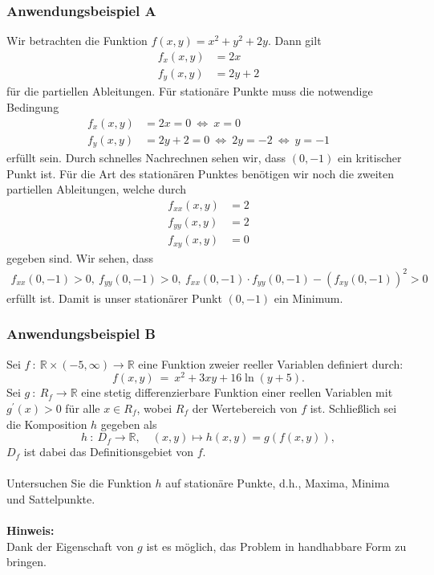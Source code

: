 \subsubsection*{Anwendungsbeispiel A}

Wir betrachten die Funktion $f(x,y) = x^2+ y^2 + 2y$.
Dann gilt
\begin{align*}
f_x(x,y) &= 2x\\
f_y(x,y) &= 2y+ 2
\end{align*}
für die partiellen Ableitungen.
Für stationäre Punkte muss die notwendige Bedingung 
\begin{align*}
f_x(x,y) &= 2x = 0 \ \Leftrightarrow \ x = 0\\
f_y(x,y) &= 2y +2 = 0 \ \Leftrightarrow \ 2y = -2 
\ \Leftrightarrow \ y = -1
\end{align*}
erfüllt sein.
Durch schnelles Nachrechnen sehen wir, dass $(0,-1)$ ein kritischer Punkt ist.
Für die Art des stationären Punktes benötigen wir noch die zweiten partiellen Ableitungen, welche durch
\begin{align*}
f_{xx}(x,y) &= 2\\
f_{yy}(x,y) &= 2\\
f_{xy}(x,y) &= 0
\end{align*}
gegeben sind.
Wir sehen, dass
\begin{align*}
f_{xx}(0,-1) > 0, \ f_{yy}(0,-1) > 0 , \ f_{xx}(0,-1) \cdot f_{yy}(0,-1) - (f_{xy}(0,-1))^2 > 0
\end{align*}
erfüllt ist.
Damit is unser stationärer Punkt $(0,-1)$ ein Minimum.
\newpage
\subsubsection*{Anwendungsbeispiel B}
Sei $f \ : \ \mathbb{R} \times (-5, \infty) \to \mathbb{R}$ eine Funktion zweier reeller Variablen definiert durch:
\begin{equation*}
f(x,y)\ = \ x^2 + 3 x y + 16 \ln(y+5).
\end{equation*}
Sei $g \ : \ R_f \to \mathbb{R}$ eine stetig differenzierbare Funktion einer reellen Variablen mit $g^\prime(x) > 0$
für alle $x \in R_f$, wobei $R_f$ der Wertebereich von $f$ ist.
Schließlich sei die Komposition $h$ gegeben als
\begin{equation*}
h \ : \ D_f \to \mathbb{R}, \quad (x,y) \mapsto h(x,y) = g(f(x,y)),
\end{equation*}
$D_f$ ist dabei das Definitionsgebiet von $f$.
\\
\\
Untersuchen Sie die Funktion $h$ auf stationäre Punkte, d.h., Maxima, Minima und Sattelpunkte.
\\
\\
\textbf{Hinweis:} \\
Dank der Eigenschaft von $g$ ist es möglich, das Problem in handhabbare Form zu bringen.\\

